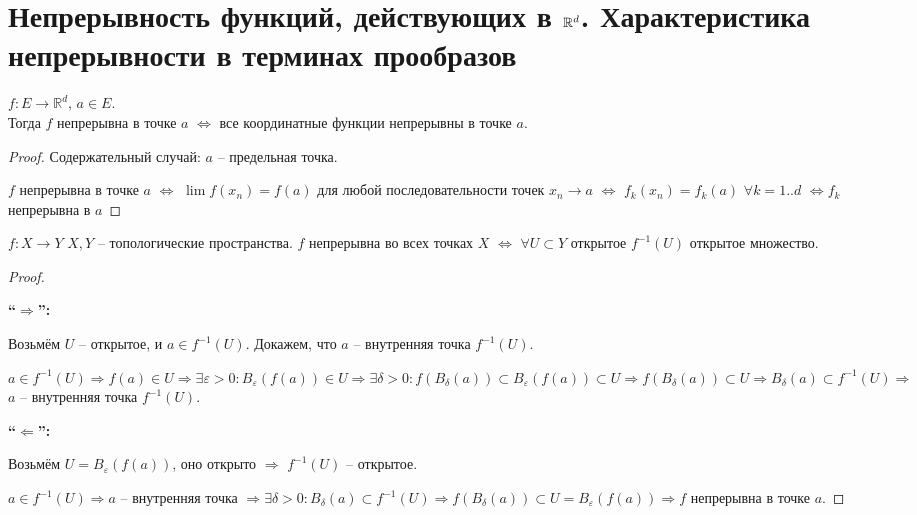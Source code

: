 
\section{Непрерывность функций, действующих в $\mathbb{R}^d$. Характеристика непрерывности в терминах прообразов}


\begin{theorem-non}
\end{theorem-non}
$f : E \rightarrow \mathbb{R}^d$, $a \in E$. \\
Тогда $f$ непрерывна в точке $a$ $\Longleftrightarrow$ все координатные
функции непрерывны в точке $a$.

\begin{proof} Содержательный случай: $a$ -- предельная точка.

    $f$ непрерывна в точке $a$ $\Longleftrightarrow$ $\lim f(x_n) = f(a)$
    для любой последовательности точек $x_n \rightarrow a$
    $\Longleftrightarrow$ $f_k(x_n) = f_k(a) \,\, \forall k = 1..d$
    $\Longleftrightarrow f_k$ непрерывна в $a$

\end{proof}

\begin{theorem-non}
\end{theorem-non}

$f : X \rightarrow Y$ $X, Y$ -- топологические пространства.
$f$ непрерывна во всех точках $X$ $\Longleftrightarrow$
$\forall U \subset Y$ открытое $f^{-1}(U)$ открытое множество.

\begin{proof} $ $

    \textbf{``$\Longrightarrow$'':}

    Возьмём $U$ -- открытое, и $a \in f^{-1}(U)$.
    Докажем, что $a$ -- внутренняя точка $f^{-1}(U)$.
    
    $a \in f^{-1}(U) \Rightarrow f(a) \in U \Rightarrow \exists
    \varepsilon > 0 : B_{\varepsilon}(f(a)) \in U \Rightarrow
    \exists \delta > 0 : f(B_{\delta}(a)) \subset B_{\varepsilon}(f(a))
    \subset U \Rightarrow f(B_{\delta}(a)) \subset U \Rightarrow
    B_{\delta}(a) \subset f^{-1}(U) \Rightarrow$ $a$ -- внутренняя точка
    $f^{-1}(U)$.

    \textbf{``$\Longleftarrow$'':}

    Возьмём $U = B_\varepsilon (f(a))$, оно открыто $\Rightarrow$
    $f^{-1}(U)$ -- открытое.

    $a \in f^{-1}(U) \Rightarrow a$ -- внутренняя точка $\Rightarrow
    \exists \delta > 0 : B_{\delta}(a) \subset f^{-1}(U) \Rightarrow
    f(B_{\delta}(a)) \subset U = B_\varepsilon(f(a)) \Rightarrow f$
    непрерывна в точке $a$.
\end{proof}